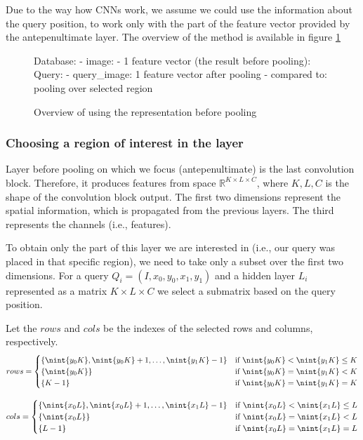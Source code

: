 Due to the way how CNNs work, we assume we could use the information about the query position, to work only with the part of the feature vector provided by the antepenultimate layer. The overview of the method is available in figure \ref{fig:antepenultimate_overview}

\begin{figure}
\centering
\begin{boxedverbatim}
Database:
    - image:
        - 1 feature vector (the result before pooling):
Query:
    - query_image: 1 feature vector after pooling
    - compared to: pooling over selected region
\end{boxedverbatim}
\caption{Overview of using the representation before pooling}
\label{fig:antepenultimate_overview}
\end{figure}


\subsubsection{Choosing a region of interest in the layer}

Layer before pooling on which we focus (antepenultimate) is the last convolution block. Therefore, it produces features from space $\mathbb{R}^{K\times L \times C}$, where $K, L, C$ is the shape of the convolution block output. The first two dimensions represent the spatial information, which is propagated from the previous layers. The third represents the channels (i.e., features).

To obtain only the part of this layer we are interested in (i.e., our query was placed in that specific region), we need to take only a subset over the first two dimensions. For a query $Q_i = (I, x_0, y_0, x_1, y_1)$ and a hidden layer $L_i$ represented as a matrix $K \times L \times C$ we select a submatrix based on the query position. 

Let the $rows$ and $cols$ be the indexes of the selected rows and columns, respectively. 
$$
    rows =
    \begin{cases}
        \{\nint{y_0 K}, \nint{y_0 K} + 1, \ldots, \nint{y_1 K}-1\} & \text{if } \nint{y_0K} < \nint{y_1K} \leq K \\
        \{\nint{y_0K}\} & \text{if } \nint{y_0K} = \nint{y_1K} < K\\
        \{K-1\} & \text{if } \nint{y_0K} = \nint{y_1K} = K\\
    \end{cases}
$$

$$
    cols =
    \begin{cases}
        \{\nint{x_0 L}, \nint{x_0 L} + 1, \ldots, \nint{x_1 L}-1\} & \text{if } \nint{x_0L} < \nint{x_1L} \leq L \\
        \{\nint{x_0L}\} & \text{if } \nint{x_0L} = \nint{x_1L} < L\\
        \{L-1\} & \text{if } \nint{x_0L} = \nint{x_1L} = L\\
    \end{cases}
$$

